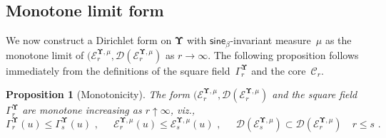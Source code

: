 \documentclass[11pt,letterpaper]{amsart}
\newcommand{\dom}[1]{\mathcal D(#1)}
\newcommand{\comma}{\,\,\mathrm{,}\;\,}
\newcommand{\fstop}{\,\,\mathrm{.}}
\newcommand{\cdc}{\Gamma}
\newcommand{\QP}{{\mu}}
\newcommand{\dUpsilon}{{\mathbf \Upsilon}}
\newcommand{\U}{\dUpsilon}
\newcommand{\sine}{\mathsf{sine}}
\newcommand{\E}{\mathcal E}
\renewcommand{\1}{\mathbf 1}
\numberwithin{equation}{section}
\theoremstyle{plain}
\newtheorem{prop}[thm]{Proposition}%
\theoremstyle{definition}
\theoremstyle{remark}
\begin{document}
\subsection{Monotone limit form}
We now construct a Dirichlet form on $\U$ with $\sine_\beta$-invariant measure~$\QP$ as the monotone limit of $(\E^{\U, \QP}_r, \dom{\E^{\U, \QP}_r}$ as $r \to \infty$.
The following proposition follows immediately from the definitions of the square field~$\Gamma^{\U}_r$ and the core~$\mathcal C_r$.
\begin{prop}[Monotonicity]\label{p:mono}
The form $(\E^{\U, \QP}_r, \dom{\E^{\U, \QP}_r}$ and the square field $\Gamma^\U_r$ are monotone increasing as $r \uparrow \infty$, viz., 
$$\cdc^\U_r(u) \le \cdc^\U_s(u)\comma \quad \E^{\U, \QP}_r(u) \le \E^{\U, \QP}_s(u) \comma \quad \dom{\E^{\U, \QP}_s} \subset \dom{\E^{\U, \QP}_r} \quad r\le s \fstop$$
\end{prop}
\end{document}
